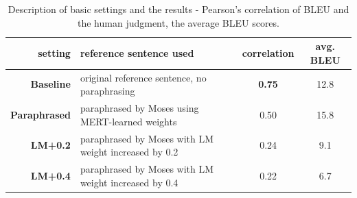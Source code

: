 \begin{table}[ht]
\begin{tabular}{r|l|c|c}
setting & reference sentence used & correlation & avg. BLEU \\
\hline
\textbf{Baseline} & original reference sentence, no paraphrasing & \textbf{0.75} & 12.8 \\
\textbf{Paraphrased} & paraphrased by Moses using MERT-learned weights  & 0.50  & 15.8 \\
\textbf{LM+0.2}  & paraphrased by Moses with LM weight increased by 0.2  & 0.24 & 9.1 \\
\textbf{LM+0.4} & paraphrased by Moses with LM weight increased by 0.4  & 0.22 & 6.7 \\
\end{tabular}
\caption{Description of basic settings and the results - Pearson's correlation of BLEU and the
human judgment, the average BLEU scores.} 
\label{settings}
\end{table}
